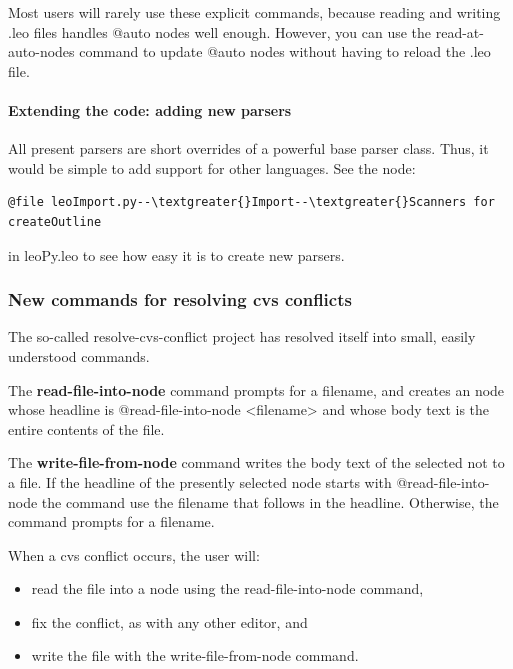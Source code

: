 \documentclass[a4paper,10pt,english]{sphinxmanual}
\begin{document}
Most users will rarely use these explicit commands, because reading and writing
.leo files handles @auto nodes well enough. However, you can use the
read-at-auto-nodes command to update @auto nodes without having to reload the
.leo file.


\paragraph{Extending the code: adding new parsers}
\label{what-is-new:extending-the-code-adding-new-parsers}
All present parsers are short overrides of a powerful base parser class. Thus,
it would be simple to add support for other languages. See the node:

\begin{Verbatim}[commandchars=\\\{\}]
@file leoImport.py--\textgreater{}Import--\textgreater{}Scanners for createOutline
\end{Verbatim}

in leoPy.leo to see how easy it is to create new parsers.


\subsubsection{New commands for resolving cvs conflicts}
\label{what-is-new:new-commands-for-resolving-cvs-conflicts}
The so-called resolve-cvs-conflict project has resolved itself into small,
easily understood commands.

The \textbf{read-file-into-node} command prompts for a filename, and creates an node
whose headline is @read-file-into-node \textless{}filename\textgreater{} and whose body text is the
entire contents of the file.

The \textbf{write-file-from-node} command writes the body text of the selected not to a file.
If the headline of the presently selected node starts with @read-file-into-node
the command use the filename that follows in the headline. Otherwise, the
command prompts for a filename.

When a cvs conflict occurs, the user will:
\begin{itemize}
\item {} 
read the file into a node using the read-file-into-node command,

\item {} 
fix the conflict, as with any other editor, and

\item {} 
write the file with the write-file-from-node command.

\end{itemize}
\end{document}
